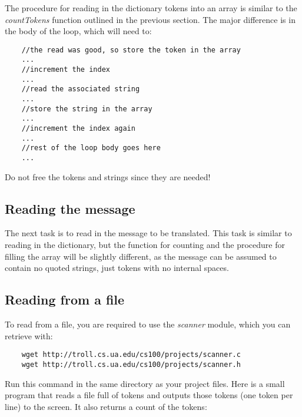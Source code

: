 \documentclass[12pt]{article}
\begin{document}
The procedure for reading in the dictionary tokens into an array
is similar to the {\it countTokens} function outlined in the previous
section. The major difference is in the body of the loop, which
will need to:

\begin{verbatim}
    //the read was good, so store the token in the array
    ...
    //increment the index
    ...
    //read the associated string
    ...
    //store the string in the array
    ...
    //increment the index again
    ...
    //rest of the loop body goes here
    ...
\end{verbatim}

Do not free the tokens and strings since they are needed!

\subsection*{Reading the message}

The next task is to read in the message to be translated.
This task is similar to reading in the dictionary, but the
function for counting and the procedure for filling the
array will be slightly different, as the message can be assumed
to contain no quoted strings, just tokens with no internal spaces.

\subsection*{Reading from a file}

To read from a file, you are required to use the {\it scanner} module, which
you can retrieve with:

\begin{verbatim}
    wget http://troll.cs.ua.edu/cs100/projects/scanner.c
    wget http://troll.cs.ua.edu/cs100/projects/scanner.h
\end{verbatim}

Run this command in the same directory as your project files.  Here is a
small program that reads a file full of tokens
and outputs those tokens 
(one token per line) to the screen.
It also returns a count of the tokens:
\end{document}
